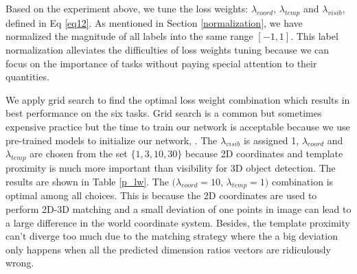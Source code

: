 Based on the experiment above, we tune the loss weights: $\lambda_{coord}$, $\lambda_{temp}$ and $\lambda_{visib}$, defined in Eq \ref{eq12}. As mentioned in Section \ref{normalization}, we have normalized the magnitude of all labels into the same range $[-1, 1]$. This label normalization alleviates the difficulties of loss weights tuning because we can focus on the importance of tasks without paying special attention to their quantities.


We apply grid search to find the optimal loss weight combination which results in best performance on the six tasks. Grid search is a common but sometimes expensive practice \cite{Goodfellow-et-al-2016} but the time to train our network is acceptable because we use pre-trained models to initialize our network, . The $\lambda_{visib}$ is assigned 1, $\lambda_{coord}$ and $\lambda_{temp}$ are chosen from the set $\{1, 3, 10, 30\}$ because 2D coordinates and template proximity is much more important than visibility for 3D object detection. The results are shown in Table \ref{p_lw}. The $(\lambda_{coord}=10$, $\lambda_{temp}=1)$ combination is optimal among all choices. This is because the 2D coordinates are used to perform 2D-3D matching and a small deviation of one points in image can lead to a large difference in the world coordinate system. Besides, the template proximity can't diverge too much due to the matching strategy where the a big deviation only happens when all the predicted dimension ratios vectors are ridiculously wrong.



